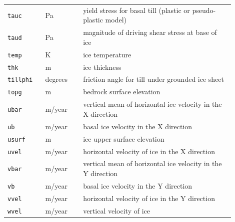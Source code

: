 \documentclass[11pt,final]{amsart}
\begin{document}
\begin{table}[h]
\begin{longtable}{p{0.15\linewidth}p{0.15\linewidth}p{0.6\linewidth}}
    \texttt{tauc} & Pa & yield stress for basal till (plastic or pseudo-plastic model) \\
    \texttt{taud} & Pa & magnitude of driving shear stress at base of ice \\
    \texttt{temp} & K & ice temperature \\
    \texttt{thk} & m & ice thickness\\
    \texttt{tillphi} & degrees & friction angle for till under grounded ice sheet \\
    \texttt{topg} & m & bedrock surface elevation \\
    \texttt{ubar} & m/year & vertical mean of horizontal ice velocity in the X direction \\
    \texttt{ub} & m/year & basal ice velocity in the X direction \\
    \texttt{usurf} & m & ice upper surface elevation \\
    \texttt{uvel} & m/year & horizontal velocity of ice in the X direction \\
    \texttt{vbar} & m/year & vertical mean of horizontal ice velocity in the Y direction \\
    \texttt{vb} & m/year & basal ice velocity in the Y direction \\
    \texttt{vvel} & m/year & horizontal velocity of ice in the Y direction \\
    \texttt{wvel} & m/year & vertical velocity of ice \\
    \hline
  \end{longtable}
 \label{tab:extra-vars}
\end{table}
\end{document}
